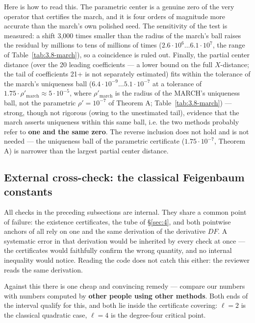 Here is how to read this. The parametric center is a genuine zero of the very operator that certifies the march, and it is four orders of magnitude more accurate than the march's own polished seed. The sensitivity of the test is measured: a shift 3,000 times smaller than the radius of the march's ball raises the residual by millions to tens of millions of times ($2.6\cdot 10^{6}\ldots 6.1\cdot 10^{7}$, the range of Table~\ref{tab:3.8-march}), so a coincidence is ruled out. Finally, the partial center distance (over the 20 leading coefficients --- a lower bound on the full $X$-distance; the tail of coefficients 21+ is not separately estimated) fits within the tolerance of the march's uniqueness ball ($6.4\cdot 10^{-9} \ldots 5.1\cdot 10^{-7}$ at a tolerance of $1.75\cdot \rho'_{\mathrm{march}} \approx 5\cdot 10^{-5}$, where $\rho'_{\mathrm{march}}$ is the radius of the MARCH's uniqueness ball, not the parametric $\rho' = 10^{-7}$ of Theorem A; Table~\ref{tab:3.8-march}) --- strong, though not rigorous (owing to the unestimated tail), evidence that the march asserts uniqueness within this same ball, i.e. the two methods probably refer to \textbf{one and the same zero}. The reverse inclusion does not hold and is not needed --- the uniqueness ball of the parametric certificate ($1.75\cdot 10^{-7}$, Theorem A) is narrower than the largest partial center distance.


\subsection{External cross-check: the classical Feigenbaum constants}\label{sec:3.9}

All checks in the preceding subsections are internal. They share a common point of failure: the existence certificates, the tube of \S\ref{sec:4}, and both pointwise anchors of  all rely on one and the same derivation of the derivative $DF$. A systematic error in that derivation would be inherited by every check at once --- the certificates would faithfully confirm the wrong quantity, and no internal inequality would notice. Reading the code does not catch this either: the reviewer reads the same derivation.

Against this there is one cheap and convincing remedy --- compare our numbers with numbers computed by \textbf{other people using other methods}. Both ends of the interval qualify for this, and both lie inside the certificate covering: $\ell = 2$ is the classical quadratic case, $\ell = 4$ is the degree-four critical point.

